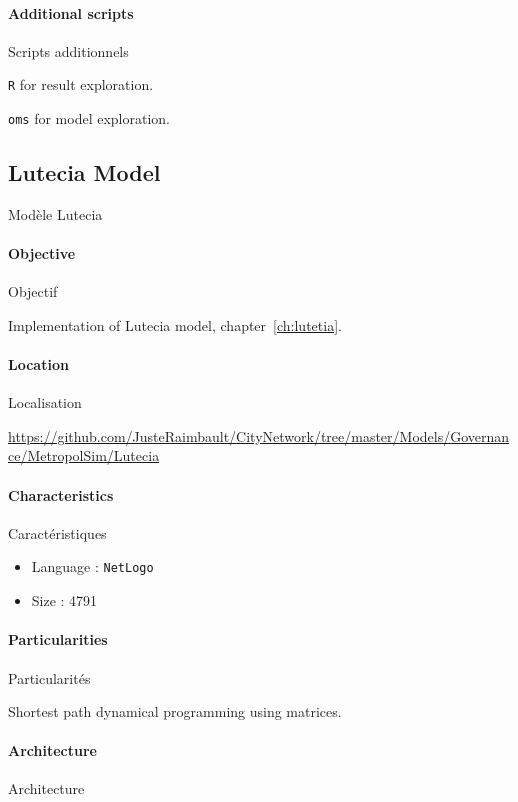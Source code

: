 \paragraph{Additional scripts}{Scripts additionnels}

\texttt{R} for result exploration.

\texttt{oms} for model exploration.







\subsection{Lutecia Model}{Modèle Lutecia}

\paragraph{Objective}{Objectif}

Implementation of Lutecia model, chapter~\ref{ch:lutetia}.

\paragraph{Location}{Localisation}

\url{https://github.com/JusteRaimbault/CityNetwork/tree/master/Models/Governance/MetropolSim/Lutecia}

\paragraph{Characteristics}{Caractéristiques}

\begin{itemize}
\item Language : \texttt{NetLogo}
\item Size : 4791
\end{itemize}


\paragraph{Particularities}{Particularités}

Shortest path dynamical programming using matrices.

\paragraph{Architecture}{Architecture}

